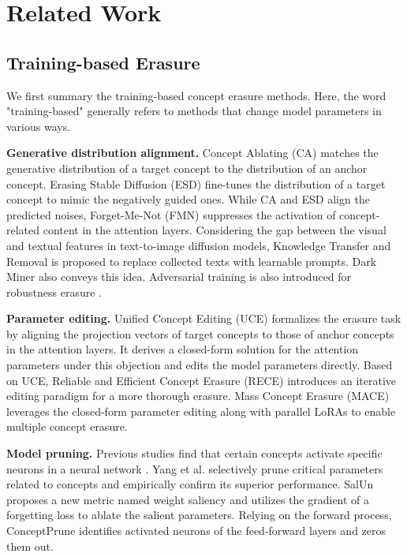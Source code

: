 \section{Related Work}
\label{sec: related work}

\subsection{Training-based Erasure}

We first summary the training-based concept erasure methods. Here, the word "training-based" generally refers to methods that change model parameters in various ways.

\textbf{Generative distribution alignment.} Concept Ablating (CA) \cite{kumari2023ablating} matches the generative distribution of a target concept to the distribution of an anchor concept. Erasing Stable Diffusion (ESD) \cite{gandikota2023erasing} fine-tunes the distribution of a target concept to mimic the negatively guided ones. While CA and ESD align the predicted noises, Forget-Me-Not (FMN) \cite{zhang2023forget} suppresses the activation of concept-related content in the attention layers. Considering the gap between the visual and textual features in text-to-image diffusion models, Knowledge Transfer and Removal \cite{bui2024removing} is proposed to replace collected texts with learnable prompts. Dark Miner \cite{meng2024dark} also conveys this idea. Adversarial training is also introduced for robustness erasure \cite{pham2024robust, kim2024race, zhang2024defensive, huang2023receler}.


\textbf{Parameter editing.} Unified Concept Editing (UCE) \cite{gandikota2024unified} formalizes the erasure task by aligning the projection vectors of target concepts to those of anchor concepts in the attention layers. It derives a closed-form solution for the attention parameters under this objection and edits the model parameters directly. Based on UCE, Reliable and Efficient Concept Erasure (RECE) \cite{gong2024reliable} introduces an iterative editing paradigm for a more thorough erasure. Mass Concept Erasure  (MACE) \cite{lu2024mace} leverages the closed-form parameter editing along with parallel LoRAs \cite{hu2021lora} to enable multiple concept erasure.


\textbf{Model pruning.} Previous studies find that certain concepts activate specific neurons in a neural network \cite{wang2022finding}. Yang et al. \cite{yang2024pruning} selectively prune critical parameters related to concepts and empirically confirm
its superior performance. SalUn \cite{fan2023salun} proposes a new metric named weight saliency and utilizes the gradient of a forgetting loss to ablate the salient parameters. Relying on the forward process, ConceptPrune \cite{chavhan2024conceptprune} identifies activated neurons of the feed-forward layers and zeros them out.


